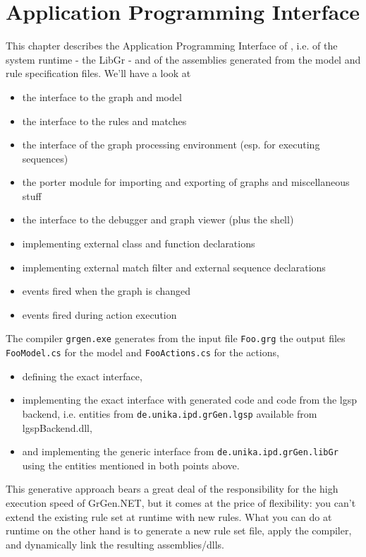 \chapter{Application Programming Interface} 
\label{cha:api}

This chapter describes the Application Programming Interface of \GrG, i.e. of the system runtime - the LibGr - and of the assemblies generated from the model and rule specification files.
We'll have a look at
\begin{itemize}
\item the interface to the graph and model
\item the interface to the rules and matches
\item the interface of the graph processing environment (esp. for executing sequences)
\item the porter module for importing and exporting of graphs and miscellaneous stuff
\item the interface to the debugger and graph viewer (plus the shell)
\item implementing external class and function declarations
\item implementing external match filter and external sequence declarations
\item events fired when the graph is changed
\item events fired during action execution
\end{itemize}

\noindent The compiler \texttt{grgen.exe} generates from the input file \texttt{Foo.grg} the output files \texttt{FooModel.cs} for the model and \texttt{FooActions.cs} for the actions,
\begin{itemize}
\item defining the exact interface, 
\item implementing the exact interface with generated code and code from the lgsp backend, i.e. entities from \texttt{de.unika.ipd.grGen.lgsp} available from lgspBackend.dll, 
\item and implementing the generic interface from \texttt{de.unika.ipd.grGen.libGr} using the entities mentioned in both points above.
\end{itemize}

\noindent This generative approach bears a great deal of the responsibility for the high execution speed of GrGen.NET, but it comes at the price of flexibility: you can't extend the existing rule set at runtime with new rules.
What you can do at runtime on the other hand is to generate a new rule set file, apply the compiler, and dynamically link the resulting assemblies/dlls.

